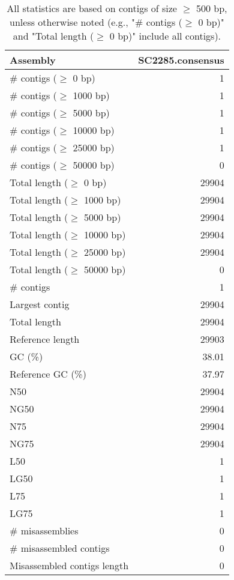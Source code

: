 \documentclass[12pt,a4paper]{article}
\begin{document}
\begin{table}[ht]
\begin{center}
\caption{All statistics are based on contigs of size $\geq$ 500 bp, unless otherwise noted (e.g., "\# contigs ($\geq$ 0 bp)" and "Total length ($\geq$ 0 bp)" include all contigs).}
\begin{tabular}{|l*{1}{|r}|}
\hline
Assembly & SC2285.consensus \\ \hline
\# contigs ($\geq$ 0 bp) & 1 \\ \hline
\# contigs ($\geq$ 1000 bp) & 1 \\ \hline
\# contigs ($\geq$ 5000 bp) & 1 \\ \hline
\# contigs ($\geq$ 10000 bp) & 1 \\ \hline
\# contigs ($\geq$ 25000 bp) & 1 \\ \hline
\# contigs ($\geq$ 50000 bp) & 0 \\ \hline
Total length ($\geq$ 0 bp) & 29904 \\ \hline
Total length ($\geq$ 1000 bp) & 29904 \\ \hline
Total length ($\geq$ 5000 bp) & 29904 \\ \hline
Total length ($\geq$ 10000 bp) & 29904 \\ \hline
Total length ($\geq$ 25000 bp) & 29904 \\ \hline
Total length ($\geq$ 50000 bp) & 0 \\ \hline
\# contigs & 1 \\ \hline
Largest contig & 29904 \\ \hline
Total length & 29904 \\ \hline
Reference length & 29903 \\ \hline
GC (\%) & 38.01 \\ \hline
Reference GC (\%) & 37.97 \\ \hline
N50 & 29904 \\ \hline
NG50 & 29904 \\ \hline
N75 & 29904 \\ \hline
NG75 & 29904 \\ \hline
L50 & 1 \\ \hline
LG50 & 1 \\ \hline
L75 & 1 \\ \hline
LG75 & 1 \\ \hline
\# misassemblies & 0 \\ \hline
\# misassembled contigs & 0 \\ \hline
Misassembled contigs length & 0 \\ \hline

\end{tabular}
\end{center}
\end{table}
\end{document}
